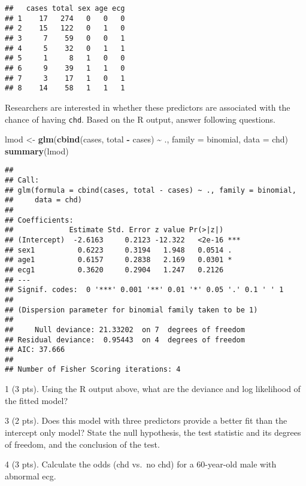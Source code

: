\documentclass[
]{article}
\newenvironment{Shaded}{\begin{snugshade}}{\end{snugshade}}
\newcommand{\AttributeTok}[1]{\textcolor[rgb]{0.13,0.29,0.53}{#1}}
\newcommand{\FunctionTok}[1]{\textcolor[rgb]{0.13,0.29,0.53}{\textbf{#1}}}
\newcommand{\NormalTok}[1]{#1}
\newcommand{\OtherTok}[1]{\textcolor[rgb]{0.56,0.35,0.01}{#1}}
\newcommand{\SpecialCharTok}[1]{\textcolor[rgb]{0.81,0.36,0.00}{\textbf{#1}}}
\begin{document}
\begin{verbatim}
##   cases total sex age ecg
## 1    17   274   0   0   0
## 2    15   122   0   1   0
## 3     7    59   0   0   1
## 4     5    32   0   1   1
## 5     1     8   1   0   0
## 6     9    39   1   1   0
## 7     3    17   1   0   1
## 8    14    58   1   1   1
\end{verbatim}

Researchers are interested in whether these predictors are associated
with the chance of having \texttt{chd}. Based on the R output, answer
following questions.

\begin{Shaded}
\begin{Highlighting}[]
\NormalTok{lmod }\OtherTok{\textless{}{-}} \FunctionTok{glm}\NormalTok{(}\FunctionTok{cbind}\NormalTok{(cases, total }\SpecialCharTok{{-}}\NormalTok{ cases) }\SpecialCharTok{\textasciitilde{}}\NormalTok{ ., }\AttributeTok{family =}\NormalTok{ binomial, }\AttributeTok{data =}\NormalTok{ chd)}
\FunctionTok{summary}\NormalTok{(lmod)}
\end{Highlighting}
\end{Shaded}

\begin{verbatim}
## 
## Call:
## glm(formula = cbind(cases, total - cases) ~ ., family = binomial, 
##     data = chd)
## 
## Coefficients:
##             Estimate Std. Error z value Pr(>|z|)    
## (Intercept)  -2.6163     0.2123 -12.322   <2e-16 ***
## sex1          0.6223     0.3194   1.948   0.0514 .  
## age1          0.6157     0.2838   2.169   0.0301 *  
## ecg1          0.3620     0.2904   1.247   0.2126    
## ---
## Signif. codes:  0 '***' 0.001 '**' 0.01 '*' 0.05 '.' 0.1 ' ' 1
## 
## (Dispersion parameter for binomial family taken to be 1)
## 
##     Null deviance: 21.33202  on 7  degrees of freedom
## Residual deviance:  0.95443  on 4  degrees of freedom
## AIC: 37.666
## 
## Number of Fisher Scoring iterations: 4
\end{verbatim}

\newpage

1 (3 pts). Using the R output above, what are the deviance and log
likelihood of the fitted model?

3 (2 pts). Does this model with three predictors provide a better fit
than the intercept only model? State the null hypothesis, the test
statistic and its degrees of freedom, and the conclusion of the test.

4 (3 pts). Calculate the odds (chd vs.~no chd) for a 60-year-old male
with abnormal ecg.
\end{document}

